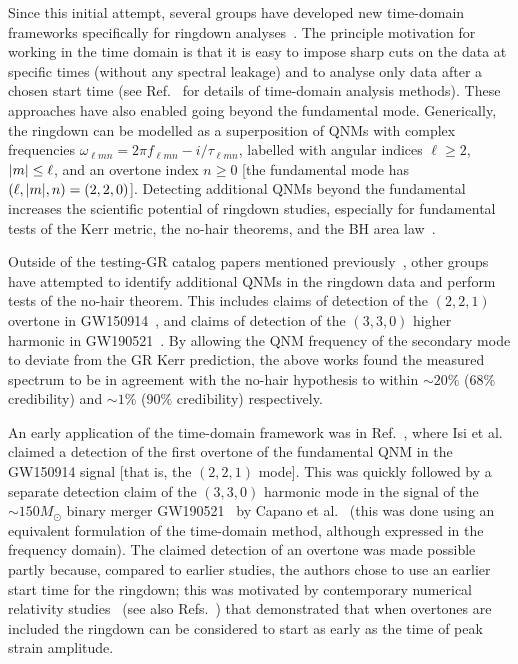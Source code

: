 Since this initial attempt, several groups have developed new time-domain frameworks specifically for ringdown analyses~\cite{Carullo:2019flw, Isi:2019aib, Capano:2021etf}.
The principle motivation for working in the time domain is that it is easy to impose sharp cuts on the data at specific times (without any spectral leakage) and to analyse only data after a chosen start time (see Ref.~\cite{Isi:2021iql} for details of time-domain analysis methods).
These approaches have also enabled going beyond the fundamental mode. 
Generically, the ringdown can be modelled as a superposition of QNMs with complex frequencies $\omega_{\ell m n} = 2\pi f_{\ell m n} - i/\tau_{\ell m n}$, labelled with angular indices $\ell\geq 2$, $\abs{m}\leq\ell$, and an overtone index $n \geq 0$ [the fundamental mode has $(\ell, \abs{m}, n) = (2, 2, 0)$].
Detecting additional QNMs beyond the fundamental increases the scientific potential of ringdown studies, especially for fundamental tests of the Kerr metric, the no-hair theorems, and the BH area law~\cite{Dreyer:2003bv, Berti:2005ys, Gossan:2011ha, Brito:2018rfr, Carullo:2019flw, Isi:2019aib, Isi:2020tac}.

Outside of the testing-GR catalog papers mentioned previously~\cite{LIGOScientific:2020tif, LIGOScientific:2021sio}, other groups have attempted to identify additional QNMs in the ringdown data and perform tests of the no-hair theorem. 
This includes claims of detection of the $(2,2,1)$ overtone in GW150914~\cite{Isi:2019aib}, and claims of detection of the $(3,3,0)$ higher harmonic in GW190521~\cite{Capano:2021etf}. 
By allowing the QNM frequency of the secondary mode to deviate from the GR Kerr prediction, the above works found the measured spectrum to be in agreement with the no-hair hypothesis to within $\sim 20\%$ ($68\%$ credibility) and $\sim 1\%$ ($90\%$ credibility) respectively.

An early application of the time-domain framework was in Ref.~\cite{Isi:2019aib}, where Isi et al. claimed a detection of the first overtone of the fundamental QNM in the GW150914 signal [that is, the $(2, 2, 1)$ mode]. 
This was quickly followed by a separate detection claim of the $(3,3,0)$ harmonic mode in the signal of the $\sim 150M_\odot$ binary merger GW190521~\cite{LIGOScientific:2020iuh} by Capano et al.~\cite{Capano:2021etf} (this was done using an equivalent formulation of the time-domain method, although expressed in the frequency domain).
The claimed detection of an overtone was made possible partly because, compared to earlier studies, the authors chose to use an earlier start time for the ringdown; this was motivated by contemporary numerical relativity studies~\cite{Giesler:2019uxc} (see also Refs.~\cite{Bhagwat:2019dtm, Ota:2019bzl, Cook:2020otn, JimenezForteza:2020cve, Dhani:2020nik, Finch:2021iip, Forteza:2021wfq, Dhani:2021vac, MaganaZertuche:2021syq}) that demonstrated that when overtones are included the ringdown can be considered to start as early as the time of peak strain amplitude. 

